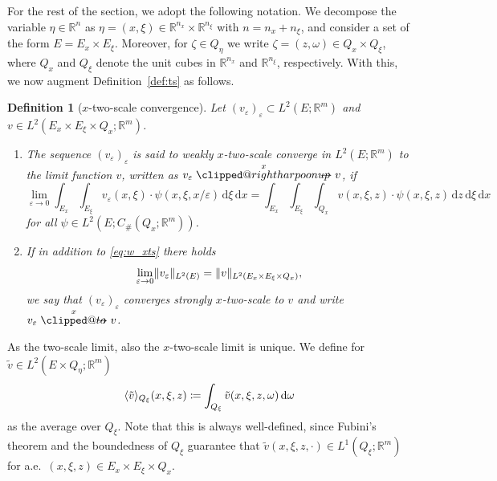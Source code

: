 \documentclass[reqno,11pt]{amsart}
\makeatletter
\numberwithin{equation}{section}
\theoremstyle{thmlemcorr}
\numberwithin{theorem}{section}
\theoremstyle{thmlemcorr*}
\theoremstyle{defi}
\newtheorem{definition}[theorem]{Definition}
\theoremstyle{remexample}
\theoremstyle{ass}
\newcommand{\R}{\mathbb{R}}
\renewcommand{\epsilon}{\varepsilon}
\DeclarePairedDelimiter{\norm}{\lVert}{\rVert}
\DeclarePairedDelimiter{\inner}{\langle}{\rangle}
\newcommand{\1}{\mathds{1}}
\DeclareRobustCommand{\wtwoscale}{%
  \clippedrightharpoonup\mathrel{\mspace{-15mu}}\rightharpoonup
}
\newcommand{\clippedrightharpoonup}{%
  \mathrel{\mathpalette\clipped@rightharpoonup\relax}%
}
\newcommand{\clipped@rightharpoonup}[2]{%
  \sbox\z@{$\m@th#1\mspace{6mu}$}%
  \clipbox{0pt 0pt {\dimexpr\width-.5\wd\z@} 0pt}{$\m@th#1\rightharpoonup$}%
  \smash{\clipbox{{\wd\z@} 0pt 0pt {-\width}}{$\m@th#1\rightharpoonup$}}%
}
\DeclareRobustCommand{\twoscale}{%
  \clippedto\mathrel{\mspace{-15mu}}\to
}
\newcommand{\clippedto}{%
  \mathrel{\mathpalette\clipped@to\relax}%
}
\newcommand{\clipped@to}[2]{%
  \sbox\z@{$\m@th#1\mspace{6mu}$}%
  \clipbox{0pt 0pt {\dimexpr\width-.5\wd\z@} 0pt}{$\m@th#1\to$}%
  \smash{\clipbox{{\wd\z@} 0pt 0pt {-\width}}{$\m@th#1\to$}}%
}
\newcommand{\xtwoscale}{\overset{x}{\twoscale}}
\newcommand{\wxtwoscale}{\overset{x}{\wtwoscale}}
\newcommand{\Om}{\Omega}
\newcommand{\veps}{\varepsilon}
\newcommand{\dl}{\,\mathrm{d}}
\newcommand{\sequence}[2]{(#1_#2)_{#2}}
\makeatother
\begin{document}
For the rest of the section, we adopt the following notation. We decompose the variable $\eta \in \R^n$ as $\eta=(x,\xi) \in \R^{n_{x}}\times\R^{n_\xi}$ with \(n=n_x+n_\xi\), and consider a set of the form \(E=E_x \times E_\xi\). Moreover, for \(\zeta \in Q_\eta\) we write \(\zeta=(z,\omega)\in Q_x\times Q_\xi\), where  \(Q_x\) and \(Q_\xi\) denote the unit cubes in $\R^{n_x}$ and $\R^{n_\xi}$, respectively. With this, we now augment Definition~\ref{def:ts} as follows.
\begin{definition}[\(x\)-two-scale convergence]\label{def:xts}
    Let \(\sequence{v}{\veps}\subset L^2(E;\R^m)\) and \(v\in L^2(E_x\times E_\xi\times Q_x;\R^m)\).
    \begin{enumerate}[label = (\roman*)]
        \item 
            The sequence \(\sequence{v}{\veps}\) is said to weakly \(x\)-two-scale converge in $L^2(E;\R^m)$ to the limit function \(v\), written as $v_{\epsilon} \wxtwoscale v$, if
            \begin{equation}\label{eq:w_xts}
                \lim_{\veps\to 0}\int_{E_x}\int_{E_\xi} v_\veps(x,\xi) \cdot \psi(x,\xi,x/\veps)\dl \xi\dl x
                =\int_{E_x}\int_{E_\xi}\int_{Q_x} v(x,\xi,z)\cdot\psi(x,\xi,z)\dl z\dl \xi\dl x
            \end{equation}
            for all \(\psi\in L^2(E;C_{\#}(Q_x;\R^m))\). \smallskip
        \item 
            If in addition to \eqref{eq:w_xts} there holds
            \begin{equation}\label{eq:s_xts}
                \lim_{\veps\to 0}\norm{v_\veps}_{L^2(E)}
                = \norm{v}_{L^2(E_x\times E_\xi\times Q_x)},
            \end{equation}
            we say that \(\sequence{v}{\veps}\) converges strongly \(x\)-two-scale to \(v\) and write $v_\epsilon \xtwoscale v$.
    \end{enumerate}
\end{definition}
As the two-scale limit, also the \(x\)-two-scale limit is unique. 
We define for \(\tilde{v}\in L^2(E\times Q_\eta;\R^m)\) 
\begin{equation*}
    \inner{\tilde{v}}_{Q_\xi}(x,\xi,z)
    \coloneqq \int_{Q_\xi}\tilde{v}(x,\xi,z,\omega)\dl \omega
\end{equation*}
as the average over \(Q_\xi\). Note that this is always well-defined, since Fubini's theorem and the boundedness of \(Q_\xi\) guarantee that \(\tilde{v}(x,\xi,z,\cdot)\in L^1(Q_\xi;\R^m)\) for a.e.~\((x,\xi,z)\in E_x\times E_\xi\times Q_x\). 
\end{document}
